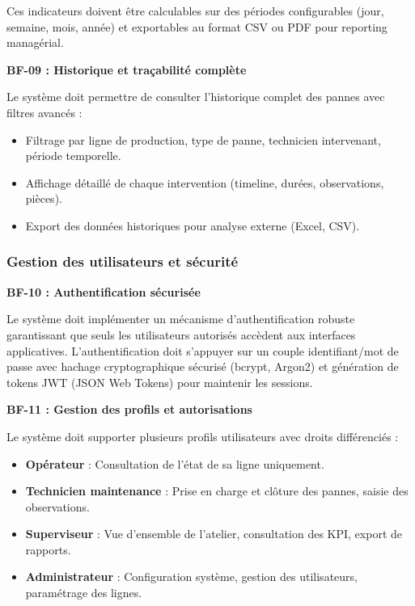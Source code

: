 Ces indicateurs doivent être calculables sur des périodes configurables (jour, semaine, mois, année) et exportables au format CSV ou PDF pour reporting managérial.

\textbf{BF-09 : Historique et traçabilité complète}

Le système doit permettre de consulter l'historique complet des pannes avec filtres avancés :

\begin{itemize}
    \item Filtrage par ligne de production, type de panne, technicien intervenant, période temporelle.
    \item Affichage détaillé de chaque intervention (timeline, durées, observations, pièces).
    \item Export des données historiques pour analyse externe (Excel, CSV).
\end{itemize}

\subsubsection{Gestion des utilisateurs et sécurité}

\textbf{BF-10 : Authentification sécurisée}

Le système doit implémenter un mécanisme d'authentification robuste garantissant que seuls les utilisateurs autorisés accèdent aux interfaces applicatives. L'authentification doit s'appuyer sur un couple identifiant/mot de passe avec hachage cryptographique sécurisé (bcrypt, Argon2) et génération de tokens JWT (JSON Web Tokens) pour maintenir les sessions.

\textbf{BF-11 : Gestion des profils et autorisations}

Le système doit supporter plusieurs profils utilisateurs avec droits différenciés :

\begin{itemize}
    \item \textbf{Opérateur} : Consultation de l'état de sa ligne uniquement.
    \item \textbf{Technicien maintenance} : Prise en charge et clôture des pannes, saisie des observations.
    \item \textbf{Superviseur} : Vue d'ensemble de l'atelier, consultation des KPI, export de rapports.
    \item \textbf{Administrateur} : Configuration système, gestion des utilisateurs, paramétrage des lignes.
\end{itemize}


